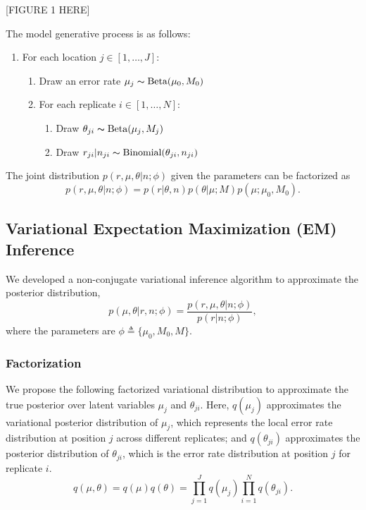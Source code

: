 \documentclass{bmcart}
\begin{document}
\vspace{2em}
\begin{center}
[FIGURE 1 HERE]  
\end{center}
\vspace{2em}


The model generative process is as follows:
\begin{enumerate}[noitemsep]
    \item For each location $j \in [1, \ldots, J]$:
	\begin{enumerate}[noitemsep]
		\item Draw an error rate $\mu_j \thicksim \text{Beta}(\mu_0, M_0)$
		\item For each replicate $i \in [1, \ldots, N]$:
		\begin{enumerate}[noitemsep]
		    \item Draw $\theta_{ji} \thicksim \text{Beta}(\mu_j, M_j)$
			\item Draw $r_{ji} | n_{ji} \thicksim \text{Binomial}(\theta_{ji}, n_{ji})$ 		
		\end{enumerate}
	\end{enumerate}
\end{enumerate}

The joint distribution $p(r, \mu, \theta|n; \phi)$ given the parameters can be factorized as
\begin{equation}
    p(r, \mu, \theta| n; \phi) = p(r |\theta, n)p(\theta |\mu; M )p(\mu;\mu_0, M_0).
\end{equation}


\subsection{Variational Expectation Maximization (EM) Inference}
We developed a non-conjugate variational inference algorithm to approximate the posterior distribution,
\begin{equation}
	p(\mu, \theta | r, n; \phi)  = \frac{ p(r, \mu, \theta| n; \phi) } {p ( r | n; \phi)},
\end{equation}
where the parameters are $\phi \triangleq \{\mu_0, M_0, M\}$.


\subsubsection{Factorization}
We propose the following factorized variational distribution to approximate the true posterior over latent variables $\mu_j$ and $\theta_{ji}$.
Here, $q(\mu_j)$ approximates the variational posterior distribution of $\mu_j$, which represents the local error rate distribution at position $j$ across different replicates;
and $q(\theta_{ji})$ approximates the posterior distribution of $\theta_{ji}$, which is the error rate distribution at position $j$ for replicate $i$.
\begin{equation}
  q(\mu, \theta) = q(\mu)q(\theta) = \prod_{j=1}^J q(\mu_{j}) \prod_{i=1}^N q(\theta_{ji}).
  \label{eq:vardist}
\end{equation}
\end{document}
